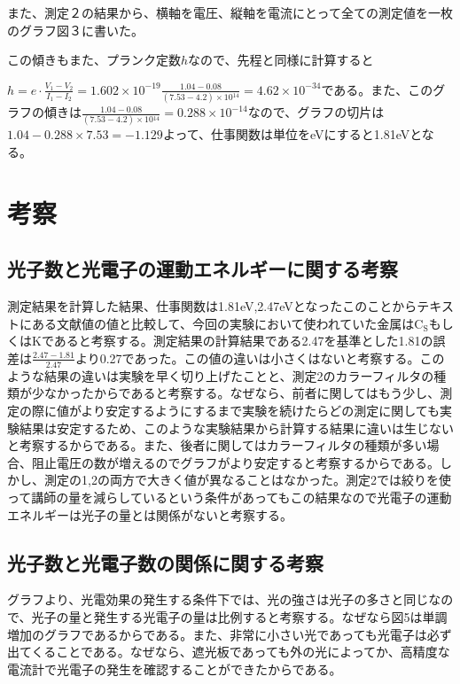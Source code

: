 \documentclass{jsarticle}
\begin{document}
また、測定２の結果から、横軸を電圧、縦軸を電流にとって全ての測定値を一枚のグラフ図３に書いた。

この傾きもまた、プランク定数$h$なので、先程と同様に計算すると
\par $h = e\cdot\frac{V_1-V_2}{I_1-I_2} = 1.602\times 10^{-19} \frac{1.04-0.08}{(7.53-4.2)\times 10{^14}} = 4.62\times 10^{-34}$である。また、このグラフの傾きは$\frac{1.04-0.08}{(7.53-4.2)\times 10{^14}} = 0.288\times 10^{-14}$なので、グラフの切片は$1.04 - 0.288\times 7.53 = -1.129$よって、仕事関数は単位をeVにすると1.81eVとなる。


\section{考察}

\subsection{光子数と光電子の運動エネルギーに関する考察}

測定結果を計算した結果、仕事関数は1.81eV,2.47eVとなったこのことからテキストにある文献値の値と比較して、今回の実験において使われていた金属は$\textrm{C}_\textrm{S}$もしくはKであると考察する。測定結果の計算結果である2.47を基準とした1.81の誤差は$\frac{2.47-1.81}{2.47}$より0.27であった。この値の違いは小さくはないと考察する。このような結果の違いは実験を早く切り上げたことと、測定2のカラーフィルタの種類が少なかったからであると考察する。なぜなら、前者に関してはもう少し、測定の際に値がより安定するようにするまで実験を続けたらどの測定に関しても実験結果は安定するため、このような実験結果から計算する結果に違いは生じないと考察するからである。また、後者に関してはカラーフィルタの種類が多い場合、阻止電圧の数が増えるのでグラフがより安定すると考察するからである。しかし、測定の1,2の両方で大きく値が異なることはなかった。測定2では絞りを使って講師の量を減らしているという条件があってもこの結果なので光電子の運動エネルギーは光子の量とは関係がないと考察する。

\subsection{光子数と光電子数の関係に関する考察}

グラフより、光電効果の発生する条件下では、光の強さは光子の多さと同じなので、光子の量と発生する光電子の量は比例すると考察する。なぜなら図5は単調増加のグラフであるからである。また、非常に小さい光であっても光電子は必ず出てくることである。なぜなら、遮光板であっても外の光によってか、高精度な電流計で光電子の発生を確認することができたからである。
\end{document}

